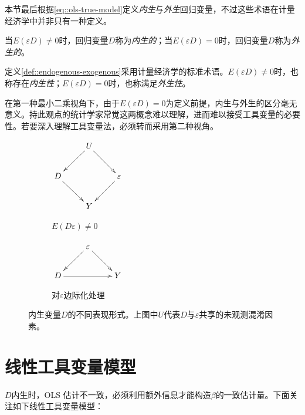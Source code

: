 本节最后根据\eqref{eq::ols-true-model}定义{\it 内生}与{\it 外生}回归变量，不过这些术语在计量经济学中并非只有一种定义。 



\begin{definition}
\label{def::endogenous-exogenous}
当$E(\varepsilon D) \neq  0$时，回归变量$D$称为{\it 内生的}；当$E(\varepsilon D) =  0$时，回归变量$D$称为{\it 外生的}。 
\end{definition}

定义\ref{def::endogenous-exogenous}采用计量经济学的标准术语。$E(\varepsilon D) \neq  0$时，也称存在{\it 内生性}；$E(\varepsilon D) =  0$时，也称满足{\it 外生性}。

在第一种最小二乘视角下，由于$E(\varepsilon D) =  0$为定义前提，内生与外生的区分毫无意义。持此观点的统计学家常觉这两概念难以理解，进而难以接受工具变量的必要性。若要深入理解工具变量法，必须转而采用第二种视角。 




 

\begin{figure}[h]
\centering
\begin{subfigure}[]{0.4\textwidth}
                \centering
$
\xymatrix{
& U \ar[dl] \ar[dr]& \\
D \ar[dr] & & \varepsilon \ar[dl] \\
&Y&
}
$                \caption{$E(D\varepsilon) \neq 0$}
        \end{subfigure}%
        
        \begin{subfigure}[]{0.4\textwidth}
                \centering
$
\xymatrix{
&\varepsilon  \ar[dl] \ar[dr] &\\
D \ar[rr]&&Y
}
$
                \caption{对$\varepsilon$边际化处理}
        \end{subfigure}%
        
\caption{内生变量$D$的不同表现形式。上图中$U$代表$D$与$\varepsilon$共享的未观测混淆因素。}\label{fig::endogenous-regressor}
\end{figure}



\section{线性工具变量模型}
\label{sec::linear-iv-model}



$D$内生时，OLS 估计不一致，必须利用额外信息才能构造$\beta$的一致估计量。下面关注如下线性工具变量模型：



